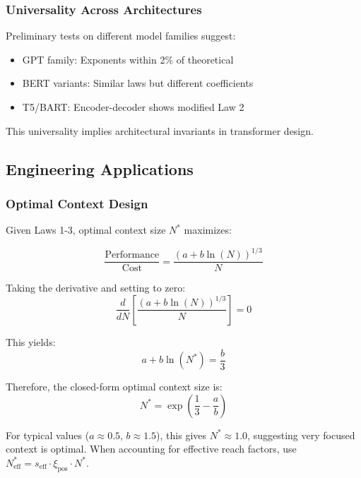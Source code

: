 \documentclass[conference]{IEEEtran}
\begin{document}
\subsubsection{Universality Across Architectures}

Preliminary tests on different model families suggest:
\begin{itemize}
\item GPT family: Exponents within 2\% of theoretical
\item BERT variants: Similar laws but different coefficients
\item T5/BART: Encoder-decoder shows modified Law 2
\end{itemize}

This universality implies architectural invariants in transformer design.

\subsection{Engineering Applications}

\subsubsection{Optimal Context Design}

Given Laws 1-3, optimal context size $N^*$ maximizes:

\begin{equation}
\frac{\text{Performance}}{\text{Cost}} = \frac{(a + b\ln(N))^{1/3}}{N}
\end{equation}

Taking the derivative and setting to zero:
\begin{equation}
\frac{d}{dN}\left[\frac{(a + b\ln(N))^{1/3}}{N}\right] = 0
\end{equation}

This yields:
\begin{equation}
a + b\ln(N^*) = \frac{b}{3}
\end{equation}

Therefore, the closed-form optimal context size is:
\begin{equation}
\boxed{N^* = \exp\left(\frac{1}{3} - \frac{a}{b}\right)}
\end{equation}

For typical values ($a \approx 0.5$, $b \approx 1.5$), this gives $N^* \approx 1.0$, suggesting very focused context is optimal. When accounting for effective reach factors, use $N_{\text{eff}}^* = s_{\text{eff}} \cdot \xi_{\text{pos}} \cdot N^*$.
\end{document}
